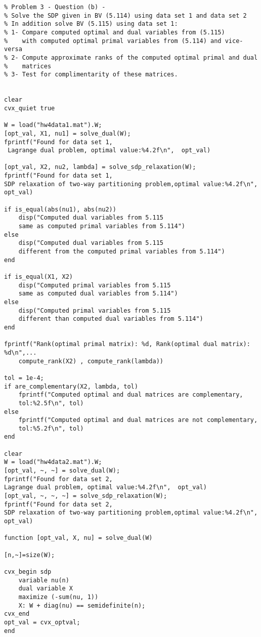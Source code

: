 \documentclass[11pt]{article}
\begin{document}
\begin{verbatim}
% Problem 3 - Question (b) - 
% Solve the SDP given in BV (5.114) using data set 1 and data set 2
% In addition solve BV (5.115) using data set 1:
% 1- Compare computed optimal and dual variables from (5.115)
%    with computed optimal primal variables from (5.114) and vice-versa
% 2- Compute approximate ranks of the computed optimal primal and dual
%    matrices
% 3- Test for complimentarity of these matrices.


clear
cvx_quiet true

W = load("hw4data1.mat").W;
[opt_val, X1, nu1] = solve_dual(W);
fprintf("Found for data set 1,
 Lagrange dual problem, optimal value:%4.2f\n",  opt_val)

[opt_val, X2, nu2, lambda] = solve_sdp_relaxation(W);
fprintf("Found for data set 1, 
SDP relaxation of two-way partitioning problem,optimal value:%4.2f\n",  opt_val)

if is_equal(abs(nu1), abs(nu2))
    disp("Computed dual variables from 5.115 
    same as computed primal variables from 5.114")
else
    disp("Computed dual variables from 5.115 
    different from the computed primal variables from 5.114")
end

if is_equal(X1, X2)
    disp("Computed primal variables from 5.115 
    same as computed dual variables from 5.114")
else
    disp("Computed primal variables from 5.115
    different than computed dual variables from 5.114")
end

fprintf("Rank(optimal primal matrix): %d, Rank(optimal dual matrix): %d\n",...
    compute_rank(X2) , compute_rank(lambda))

tol = 1e-4;
if are_complementary(X2, lambda, tol)
    fprintf("Computed optimal and dual matrices are complementary, 
    tol:%2.5f\n", tol)
else    
    fprintf("Computed optimal and dual matrices are not complementary, 
    tol:%5.2f\n", tol)
end

clear
W = load("hw4data2.mat").W;
[opt_val, ~, ~] = solve_dual(W);
fprintf("Found for data set 2, 
Lagrange dual problem, optimal value:%4.2f\n",  opt_val)
[opt_val, ~, ~, ~] = solve_sdp_relaxation(W);
fprintf("Found for data set 2, 
SDP relaxation of two-way partitioning problem,optimal value:%4.2f\n",  opt_val)

function [opt_val, X, nu] = solve_dual(W)

[n,~]=size(W);

cvx_begin sdp
    variable nu(n)
    dual variable X
    maximize (-sum(nu, 1))
    X: W + diag(nu) == semidefinite(n);
cvx_end
opt_val = cvx_optval;
end


\end{verbatim}
\end{document}
